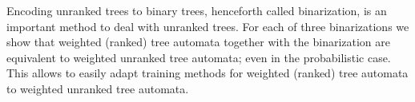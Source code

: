 Encoding unranked trees to binary trees, henceforth called binarization, is an important method to deal with unranked trees. For each of three binarizations we show that weighted (ranked) tree automata together with the binarization are equivalent to weighted unranked tree automata; even in the probabilistic case. This allows to easily adapt training methods for weighted (ranked) tree automata to weighted unranked tree automata.
